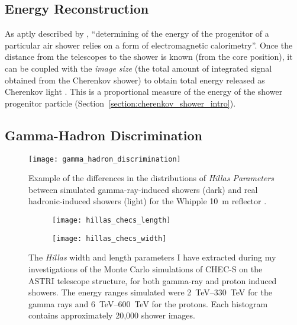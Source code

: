 \subsection{Energy Reconstruction}

As aptly described by \textcite[][p.~16]{Dickinson2010}, ``determining of the energy of the progenitor of a particular air shower relies on a form of electromagnetic calorimetry''. Once the distance from the telescopes to the shower is known (from the core position), it can be coupled with the \textit{image size} (the total amount of integrated signal obtained from the Cherenkov shower) to obtain total energy released as Cherenkov light \cite{Cogan2006,Bernlohr2013a}. This is a proportional measure of the energy of the shower progenitor particle (Section~\ref{section:cherenkov_shower_intro}).

\subsection{Gamma-Hadron Discrimination}

\begin{figure}
	\centering
    \texttt{[image: gamma\_hadron\_discrimination]} 
	\caption[Discriminating between images of gamma-ray and hadron induced showers.]{Example of the differences in the distributions of \textit{Hillas Parameters} between simulated gamma-ray-induced showers (dark) and real hadronic-induced showers (light) for the Whipple \SI{10}{m} reflector \cite{Fegan1999a}.}
	\label{fig:gamma_hadron_discrimination}
\end{figure}

\begin{figure}
  \begin{subfigure}[b]{0.49\textwidth}
    \texttt{[image: hillas\_checs\_length]}
    \caption{}
    \label{fig:hillas_checs_length}
  \end{subfigure}
  \hfill
  \begin{subfigure}[b]{0.49\textwidth}
    \texttt{[image: hillas\_checs\_width]}
    \caption{}
    \label{fig:hillas_checs_width}
  \end{subfigure}
  \caption[Hillas width and length from CHEC-S simulations.]{The \textit{Hillas} width and length parameters I have extracted during my investigations of the Monte Carlo simulations of CHEC-S on the ASTRI telescope structure, for both gamma-ray and proton induced showers. The energy ranges simulated were \SIrange{2}{330}{TeV} for the gamma rays and \SIrange{6}{600}{TeV} for the protons. Each histogram contains approximately 20,000 shower images.}
    \label{fig:hillas_checs}
\end{figure}

